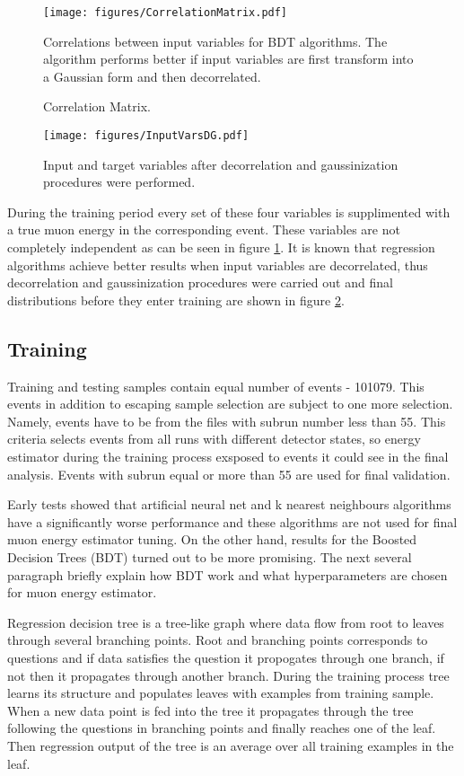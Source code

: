 \begin{figure}[!th]
\centering
\texttt{[image: figures/CorrelationMatrix.pdf]}
\caption{Correlation Matrix.}
{Correlations between input variables for BDT algorithms. The algorithm performs better if input
variables are first transform into a Gaussian form and then decorrelated. }
\label{fig:corrMatrix}
\end{figure}

\begin{figure}[!th]
\centering
\texttt{[image: figures/InputVarsDG.pdf]}
\caption{Input and target variables after decorrelation and gaussinization procedures were performed.}
\label{fig:inputDG}
\end{figure}
During the training period every set of these four variables is supplimented with a true muon
energy in the corresponding event. These variables are not completely independent as 
can be seen in figure \ref{fig:corrMatrix}. It is known that regression algorithms achieve 
better results when input variables are decorrelated, thus decorrelation and gaussinization
procedures were carried out and final distributions before they enter training are shown in figure
\ref{fig:inputDG}.

\subsection{Training}
Training and testing samples contain equal number of events - 101079. This events in addition
to escaping sample selection are subject to one more selection. Namely, events have to be
from the files with subrun number less than 55. This criteria selects events from all
runs with different detector states, so energy estimator during the training process exsposed
to events it could see in the final analysis. Events with subrun equal or more than 55 are used 
for final validation. 

Early tests showed that artificial neural net and k nearest neighbours algorithms have a 
significantly worse performance and these algorithms are not used for final muon energy 
estimator tuning. On the other hand, results for the Boosted Decision Trees (BDT) turned out
to be more promising. The next several paragraph briefly explain how BDT work and what 
hyperparameters are chosen for muon energy estimator.

Regression decision tree is a tree-like graph where data flow from root to leaves through 
several branching points. Root and branching points corresponds to questions and if data 
satisfies the question it propogates through one branch, if not then it propagates through
another branch. During the training process tree learns its structure and populates leaves 
with examples from training sample. When a new data point is fed into the tree it propagates
through the tree following the questions in branching points and finally reaches one of the leaf. 
Then regression output of the tree is an average over all training examples in the leaf. 

